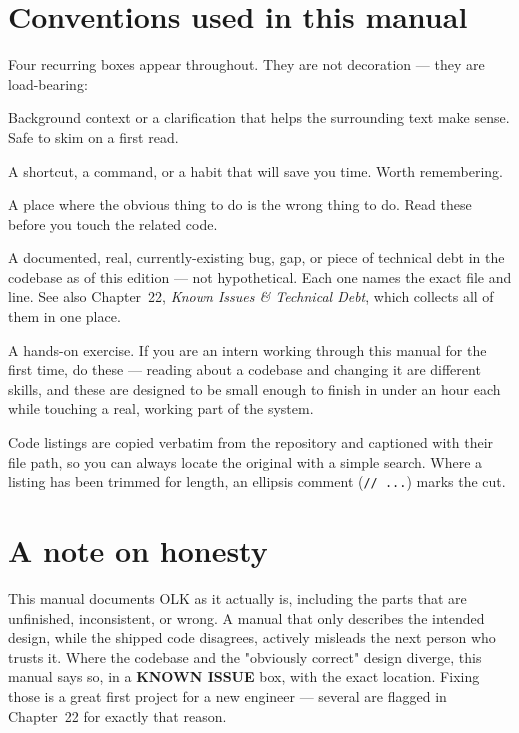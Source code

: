\section*{Conventions used in this manual}

Four recurring boxes appear throughout. They are not decoration — they are load-bearing:

\begin{olknote}
Background context or a clarification that helps the surrounding text make sense. Safe to skim on a first read.
\end{olknote}

\begin{olktip}
A shortcut, a command, or a habit that will save you time. Worth remembering.
\end{olktip}

\begin{olkwarn}
A place where the obvious thing to do is the wrong thing to do. Read these before you touch the related code.
\end{olkwarn}

\begin{olkgotcha}
A documented, real, currently-existing bug, gap, or piece of technical debt in the codebase as of this edition — not hypothetical. Each one names the exact file and line. See also Chapter~22, \emph{Known Issues \& Technical Debt}, which collects all of them in one place.
\end{olkgotcha}

\begin{olktask}
A hands-on exercise. If you are an intern working through this manual for the first time, do these — reading about a codebase and changing it are different skills, and these are designed to be small enough to finish in under an hour each while touching a real, working part of the system.
\end{olktask}

Code listings are copied verbatim from the repository and captioned with their file path, so you can always locate the original with a simple search. Where a listing has been trimmed for length, an ellipsis comment (\texttt{// ...}) marks the cut.

\section*{A note on honesty}

This manual documents OLK as it actually is, including the parts that are unfinished, inconsistent, or wrong. A manual that only describes the intended design, while the shipped code disagrees, actively misleads the next person who trusts it. Where the codebase and the "obviously correct" design diverge, this manual says so, in a \textbf{KNOWN ISSUE} box, with the exact location. Fixing those is a great first project for a new engineer — several are flagged in Chapter~22 for exactly that reason.
